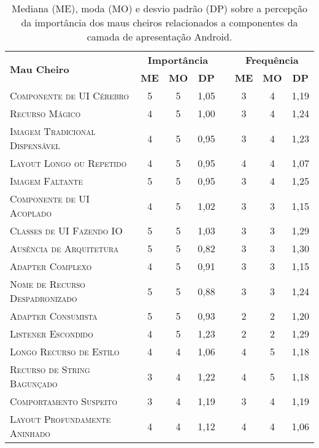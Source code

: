 \begin{table}[!htb]
\centering
\renewcommand*{\arraystretch}{1}
\footnotesize 
\caption{Mediana (ME), moda (MO) e desvio padrão (DP) sobre a percepção da importância dos maus cheiros relacionados a componentes da camada de apresentação Android.}
\begin{tabular}{@{}p{9cm}cccp{.5cm}ccc@{}}
\toprule
\multirow{2}{*}{\textbf{Mau Cheiro}} & \multicolumn{3}{c}{\textbf{Importância}} & & \multicolumn{3}{c}{\textbf{Frequência}} \\ \cmidrule{2-4} \cmidrule{6-8}
                                      & \textbf{ME} & \textbf{MO} & \textbf{DP} & & \textbf{ME} & \textbf{MO} & \textbf{DP} \\
\bottomrule
\textsc{Componente de UI Cérebro} & 5 & 5 & 1,05 & & 3 & 4 & 1,19 \\ 
\textsc{Recurso Mágico} & 4 & 5 & 1,00 & & 3 & 4 & 1,24 \\ 
\textsc{Imagem Tradicional Dispensável} & 4 & 5 & 0,95 & & 3 & 4 & 1,23 \\ 
\textsc{Layout Longo ou Repetido} & 4 & 5 & 0,95 & & 4 & 4 & 1,07 \\ 
\textsc{Imagem Faltante} & 5 & 5 & 0,95 & & 3 & 4 & 1,25 \\ 
\textsc{Componente de UI Acoplado} & 4 & 5 & 1,02 & & 3 & 3 & 1,15 \\ 
\textsc{Classes de UI Fazendo IO} & 5 & 5 & 1,03 & & 3 & 3 & 1,29 \\ 
\textsc{Ausência de Arquitetura} & 5 & 5 & 0,82 & & 3 & 3 & 1,30 \\ 
\textsc{Adapter Complexo} & 4 & 5 & 0,91 & & 3 & 3 & 1,15 \\ 
\textsc{Nome de Recurso Despadronizado} & 5 & 5 & 0,88 & & 3 & 3 & 1,24 \\ 
\textsc{Adapter Consumista} & 5 & 5 & 0,93 & & 2 & 2 & 1,20 \\ 
\textsc{Listener Escondido} & 4 & 5 & 1,23 & & 2 & 2 & 1,29 \\ 
\textsc{Longo Recurso de Estilo} & 4 & 4 & 1,06 & & 4 & 5 & 1,18 \\ 
\textsc{Recurso de String Bagunçado} & 3 & 4 & 1,22 & & 4 & 5 & 1,18 \\ 
\textsc{Comportamento Suspeito} & 3 & 4 & 1,19 & & 3 & 4 & 1,19 \\ 
\textsc{Layout Profundamente Aninhado} & 4 & 4 & 1,12 & & 4 & 4 & 1,06 \\ 

\end{tabular}
\end{table}
